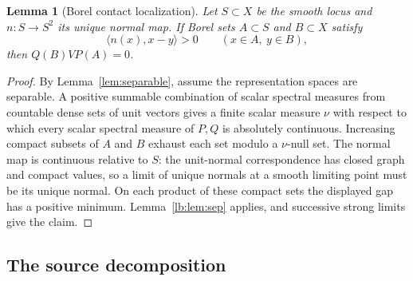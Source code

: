 \documentclass[11pt,letterpaper]{amsart}
\newtheorem{lemma}[theorem]{Lemma}
\theoremstyle{definition}
\theoremstyle{remark}
\numberwithin{equation}{section}
\begin{document}
\begin{lemma}[Borel contact localization]\label{lem:contact}
Let $S\subset X$ be the smooth locus and $n:S\to S^2$ its unique
normal map. If Borel sets $A\subset S$ and $B\subset X$ satisfy
\[
                  \langle n(x),x-y\rangle>0
                    \qquad(x\in A,\ y\in B),
\]
then $Q(B)VP(A)=0$.
\end{lemma}
\begin{proof}
By Lemma~\ref{lem:separable}, assume the representation spaces are
separable. A positive summable combination of scalar spectral measures
from countable dense sets of unit vectors gives a finite scalar measure $\nu$ with respect to which every scalar spectral measure
of $P,Q$ is absolutely continuous. Increasing compact subsets of $A$ and
$B$ exhaust each set modulo a $\nu$-null set. The normal map is continuous
relative to $S$: the unit-normal correspondence has closed graph and
compact values, so a limit of unique normals at a smooth limiting point
must be its unique normal. On each product of these compact sets the
displayed gap has a positive minimum. Lemma~\ref{lb:lem:sep} applies, and
successive strong limits give the claim.
\end{proof}

\subsection{The source decomposition}
\end{document}
